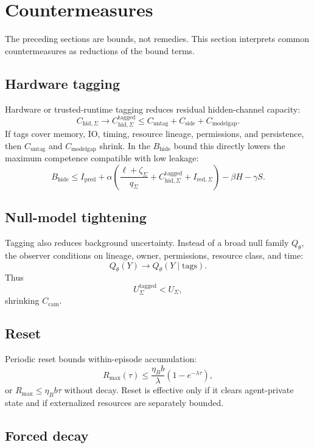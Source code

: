 \documentclass[10pt]{article}
\begin{document}
\section{Countermeasures}

The preceding sections are bounds, not remedies. This section interprets common countermeasures as reductions of the bound terms.

\subsection{Hardware tagging}

Hardware or trusted-runtime tagging reduces residual hidden-channel capacity:
\[
C_{\mathrm{hid},\Sigma}
\to
C_{\mathrm{hid},\Sigma}^{\mathrm{tagged}}
\le
C_{\mathrm{untag}}+C_{\mathrm{side}}+C_{\mathrm{modelgap}}.
\]
If tags cover memory, IO, timing, resource lineage, permissions, and persistence, then \(C_{\mathrm{untag}}\) and \(C_{\mathrm{modelgap}}\) shrink. In the \(B_{\mathrm{hide}}\) bound this directly lowers the maximum competence compatible with low leakage:
\[
B_{\mathrm{hide}}
\le
I_{\mathrm{pred}}
+
\alpha
\left(
\frac{\ell+\zeta_\Sigma}{q_\Sigma}
+
C_{\mathrm{hid},\Sigma}^{\mathrm{tagged}}
+
I_{\mathrm{red},\Sigma}
\right)
-
\beta H
-
\gamma S.
\]

\subsection{Null-model tightening}

Tagging also reduces background uncertainty. Instead of a broad null family \(Q_\theta\), the observer conditions on lineage, owner, permissions, resource class, and time:
\[
Q_\theta(Y)
\to
Q_\theta(Y\mid \mathrm{tags}).
\]
Thus
\[
U_\Sigma^{\mathrm{tagged}}<U_\Sigma,
\]
shrinking \(C_{\mathrm{cam}}\).

\subsection{Reset}

Periodic reset bounds within-episode accumulation:
\[
R_{\max}(\tau)
\le
\frac{\eta_B b}{\lambda}(1-e^{-\lambda\tau}),
\]
or \(R_{\max}\le\eta_B b\tau\) without decay. Reset is effective only if it clears agent-private state and if externalized resources are separately bounded.

\subsection{Forced decay}
\end{document}
